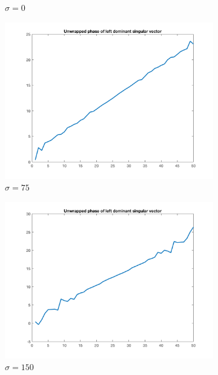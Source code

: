 \begin{figure}[htpb]
\begin{subfigure}{.25\textwidth}
\caption{$\sigma = 0$}
\end{subfigure}%
\begin{subfigure}{.25\textwidth}
\includegraphics[width=1\textwidth]{img/Hoge1DYSigma75}
\caption{$\sigma = 75$}
\end{subfigure}%
\begin{subfigure}{.25\textwidth}
\includegraphics[width=1\textwidth]{img/Hoge1DYSigma150}
\caption{$\sigma = 150$}
\end{subfigure}%
\begin{subfigure}{.25\textwidth}

\end{subfigure}
\end{figure}
